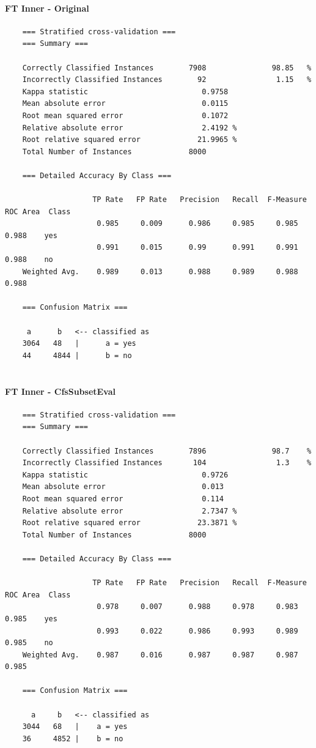\paragraph{FT Inner - Original}
{\footnotesize
	\begin{verbatim}
	=== Stratified cross-validation ===
	=== Summary ===
	
	Correctly Classified Instances        7908               98.85   %
	Incorrectly Classified Instances        92                1.15   %
	Kappa statistic                          0.9758
	Mean absolute error                      0.0115
	Root mean squared error                  0.1072
	Relative absolute error                  2.4192 %
	Root relative squared error             21.9965 %
	Total Number of Instances             8000     
	
	=== Detailed Accuracy By Class ===
	
	                TP Rate   FP Rate   Precision   Recall  F-Measure   ROC Area  Class
	                 0.985     0.009      0.986     0.985     0.985      0.988    yes
	                 0.991     0.015      0.99      0.991     0.991      0.988    no
	Weighted Avg.    0.989     0.013      0.988     0.989     0.988      0.988
	
	=== Confusion Matrix ===
	
	 a      b   <-- classified as
	3064   48   |      a = yes
	44     4844 |      b = no
	
	\end{verbatim}
}

\paragraph{FT Inner - CfsSubsetEval}
{\footnotesize
	\begin{verbatim}
	=== Stratified cross-validation ===
	=== Summary ===
	
	Correctly Classified Instances        7896               98.7    %
	Incorrectly Classified Instances       104                1.3    %
	Kappa statistic                          0.9726
	Mean absolute error                      0.013 
	Root mean squared error                  0.114 
	Relative absolute error                  2.7347 %
	Root relative squared error             23.3871 %
	Total Number of Instances             8000     
	
	=== Detailed Accuracy By Class ===
	
	                TP Rate   FP Rate   Precision   Recall  F-Measure   ROC Area  Class
	                 0.978     0.007      0.988     0.978     0.983      0.985    yes
	                 0.993     0.022      0.986     0.993     0.989      0.985    no
	Weighted Avg.    0.987     0.016      0.987     0.987     0.987      0.985
	
	=== Confusion Matrix ===
	
	  a     b   <-- classified as
	3044   68   |    a = yes
	36     4852 |    b = no	
	\end{verbatim}
}

